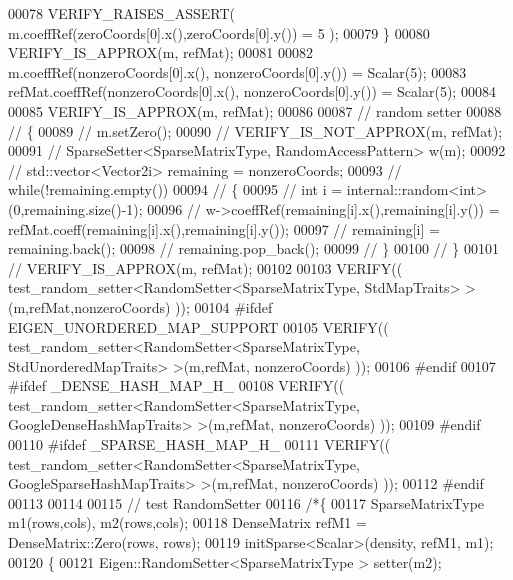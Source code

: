 \begin{DoxyCode}
00078       VERIFY\_RAISES\_ASSERT( m.coeffRef(zeroCoords[0].x(),zeroCoords[0].y()) = 5 );
00079   \}
00080   VERIFY\_IS\_APPROX(m, refMat);
00081 
00082   m.coeffRef(nonzeroCoords[0].x(), nonzeroCoords[0].y()) = Scalar(5);
00083   refMat.coeffRef(nonzeroCoords[0].x(), nonzeroCoords[0].y()) = Scalar(5);
00084 
00085   VERIFY\_IS\_APPROX(m, refMat);
00086 
00087   \textcolor{comment}{// random setter}
00088 \textcolor{comment}{//   \{}
00089 \textcolor{comment}{//     m.setZero();}
00090 \textcolor{comment}{//     VERIFY\_IS\_NOT\_APPROX(m, refMat);}
00091 \textcolor{comment}{//     SparseSetter<SparseMatrixType, RandomAccessPattern> w(m);}
00092 \textcolor{comment}{//     std::vector<Vector2i> remaining = nonzeroCoords;}
00093 \textcolor{comment}{//     while(!remaining.empty())}
00094 \textcolor{comment}{//     \{}
00095 \textcolor{comment}{//       int i = internal::random<int>(0,remaining.size()-1);}
00096 \textcolor{comment}{//       w->coeffRef(remaining[i].x(),remaining[i].y()) = refMat.coeff(remaining[i].x(),remaining[i].y());}
00097 \textcolor{comment}{//       remaining[i] = remaining.back();}
00098 \textcolor{comment}{//       remaining.pop\_back();}
00099 \textcolor{comment}{//     \}}
00100 \textcolor{comment}{//   \}}
00101 \textcolor{comment}{//   VERIFY\_IS\_APPROX(m, refMat);}
00102 
00103     VERIFY(( test\_random\_setter<RandomSetter<SparseMatrixType, StdMapTraits> >(m,refMat,nonzeroCoords) ));
00104 \textcolor{preprocessor}{    #ifdef EIGEN\_UNORDERED\_MAP\_SUPPORT}
00105     VERIFY(( test\_random\_setter<RandomSetter<SparseMatrixType, StdUnorderedMapTraits> >(m,refMat,
      nonzeroCoords) ));
00106 \textcolor{preprocessor}{    #endif}
00107 \textcolor{preprocessor}{    #ifdef \_DENSE\_HASH\_MAP\_H\_}
00108     VERIFY(( test\_random\_setter<RandomSetter<SparseMatrixType, GoogleDenseHashMapTraits> >(m,refMat,
      nonzeroCoords) ));
00109 \textcolor{preprocessor}{    #endif}
00110 \textcolor{preprocessor}{    #ifdef \_SPARSE\_HASH\_MAP\_H\_}
00111     VERIFY(( test\_random\_setter<RandomSetter<SparseMatrixType, GoogleSparseHashMapTraits> >(m,refMat,
      nonzeroCoords) ));
00112 \textcolor{preprocessor}{    #endif}
00113 
00114 
00115   \textcolor{comment}{// test RandomSetter}
00116   \textcolor{comment}{/*\{}
00117 \textcolor{comment}{    SparseMatrixType m1(rows,cols), m2(rows,cols);}
00118 \textcolor{comment}{    DenseMatrix refM1 = DenseMatrix::Zero(rows, rows);}
00119 \textcolor{comment}{    initSparse<Scalar>(density, refM1, m1);}
00120 \textcolor{comment}{    \{}
00121 \textcolor{comment}{      Eigen::RandomSetter<SparseMatrixType > setter(m2);}

\end{DoxyCode}
